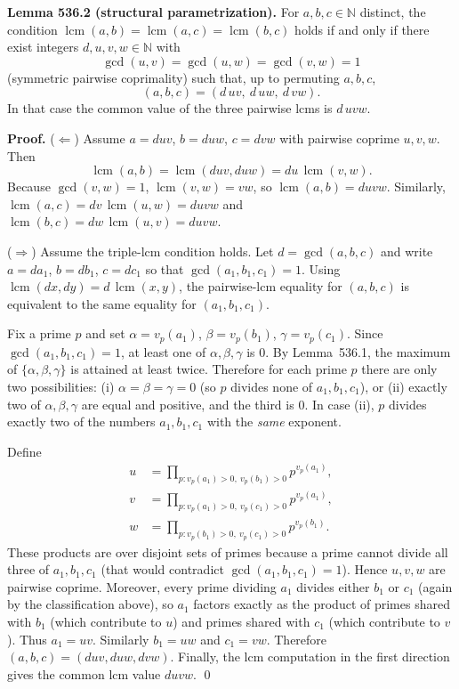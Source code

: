 \medskip
\textbf{Lemma 536.2 (structural parametrization).}
For $a,b,c\in\mathbb N$ distinct, the condition
$\operatorname{lcm}(a,b)=\operatorname{lcm}(a,c)=\operatorname{lcm}(b,c)$
holds if and only if there exist integers $d,u,v,w\in\mathbb N$ with
\[
\gcd(u,v)=\gcd(u,w)=\gcd(v,w)=1
\]
(symmetric pairwise coprimality) such that, up to permuting $a,b,c$,
\[
(a,b,c)=(d\,u v,\ d\,u w,\ d\,v w).
\]
In that case the common value of the three pairwise lcms is $d\,u v w$.

\textbf{Proof.}
($\Leftarrow$) Assume $a=d u v$, $b=d u w$, $c=d v w$ with pairwise coprime $u,v,w$.
Then
\[
\operatorname{lcm}(a,b)=\operatorname{lcm}(d u v, d u w)=d u\,\operatorname{lcm}(v,w).
\]
Because $\gcd(v,w)=1$, $\operatorname{lcm}(v,w)=vw$, so $\operatorname{lcm}(a,b)=d u v w$.
Similarly, $\operatorname{lcm}(a,c)=d v\,\operatorname{lcm}(u,w)=d u v w$ and $\operatorname{lcm}(b,c)=d w\,\operatorname{lcm}(u,v)=d u v w$.

($\Rightarrow$) Assume the triple-lcm condition holds.
Let $d=\gcd(a,b,c)$ and write $a=d a_1$, $b=d b_1$, $c=d c_1$ so that $\gcd(a_1,b_1,c_1)=1$.
Using $\operatorname{lcm}(d x, d y)=d\,\operatorname{lcm}(x,y)$, the pairwise-lcm equality for $(a,b,c)$ is equivalent to the same equality for $(a_1,b_1,c_1)$.

Fix a prime $p$ and set $\alpha=v_p(a_1)$, $\beta=v_p(b_1)$, $\gamma=v_p(c_1)$.
Since $\gcd(a_1,b_1,c_1)=1$, at least one of $\alpha,\beta,\gamma$ is $0$.
By Lemma~536.1, the maximum of $\{\alpha,\beta,\gamma\}$ is attained at least twice.
Therefore for each prime $p$ there are only two possibilities:
(i) $\alpha=\beta=\gamma=0$ (so $p$ divides none of $a_1,b_1,c_1$), or
(ii) exactly two of $\alpha,\beta,\gamma$ are equal and positive, and the third is $0$.
In case (ii), $p$ divides exactly two of the numbers $a_1,b_1,c_1$ with the \emph{same} exponent.

Define
\begin{align*}
 u &= \prod_{p: v_p(a_1)>0,\ v_p(b_1)>0} p^{v_p(a_1)} ,\\
 v &= \prod_{p: v_p(a_1)>0,\ v_p(c_1)>0} p^{v_p(a_1)} ,\\
 w &= \prod_{p: v_p(b_1)>0,\ v_p(c_1)>0} p^{v_p(b_1)}.
\end{align*}
These products are over disjoint sets of primes because a prime cannot divide all three of $a_1,b_1,c_1$ (that would contradict $\gcd(a_1,b_1,c_1)=1$).
Hence $u,v,w$ are pairwise coprime.
Moreover, every prime dividing $a_1$ divides either $b_1$ or $c_1$ (again by the classification above), so $a_1$ factors exactly as the product of primes shared with $b_1$ (which contribute to $u$) and primes shared with $c_1$ (which contribute to $v$). Thus $a_1=uv$.
Similarly $b_1=uw$ and $c_1=vw$.
Therefore $(a,b,c)=(d u v, d u w, d v w)$.
Finally, the lcm computation in the first direction gives the common lcm value $d u v w$. \qed


